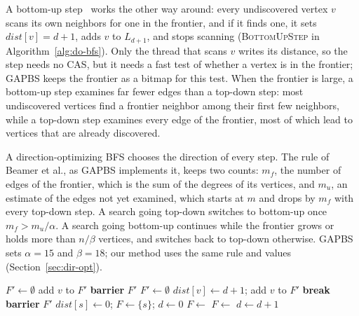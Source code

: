 A bottom-up step~\cite{beamer_dobfs} works the other way around: every undiscovered vertex $v$ scans its own neighbors for one in the frontier, and if it finds one, it sets $\mathit{dist}[v] = d+1$, adds $v$ to $L_{d+1}$, and stops scanning (\textsc{BottomUpStep} in Algorithm~\ref{alg:do-bfs}). Only the thread that scans $v$ writes its distance, so the step needs no CAS, but it needs a fast test of whether a vertex is in the frontier; GAPBS keeps the frontier as a bitmap for this test. When the frontier is large, a bottom-up step examines far fewer edges than a top-down step: most undiscovered vertices find a frontier neighbor among their first few neighbors, while a top-down step examines every edge of the frontier, most of which lead to vertices that are already discovered.

A direction-optimizing BFS chooses the direction of every step. The rule of Beamer et al., as GAPBS implements it, keeps two counts: $m_f$, the number of edges of the frontier, which is the sum of the degrees of its vertices, and $m_u$, an estimate of the edges not yet examined, which starts at $m$ and drops by $m_f$ with every top-down step. A search going top-down switches to bottom-up once $m_f > m_u / \alpha$. A search going bottom-up continues while the frontier grows or holds more than $n / \beta$ vertices, and switches back to top-down otherwise. GAPBS sets $\alpha = 15$ and $\beta = 18$; our method uses the same rule and values (Section~\ref{sec:dir-opt}).

\begin{algorithm}
\caption{Level-synchronous direction-optimizing BFS, as in GAPBS. Every step ends at a barrier.}
\label{alg:do-bfs}
\begin{algorithmic}[1]
    \State $F' \gets \emptyset$
                \State add $v$ to $F'$
            \EndIf
        \EndFor
    \EndFor
    \State \textbf{barrier} 
    \State \Return $F'$
\EndProcedure
\Statex
{}
    \State $F' \gets \emptyset$
                \State $\mathit{dist}[v] \gets d+1$; add $v$ to $F'$
                \State \textbf{break}
            \EndIf
        \EndFor
    \EndFor
    \State \textbf{barrier} 
    \State \Return $F'$
\EndProcedure
\Statex
{}
    \State $\mathit{dist}[s] \gets 0$; $F \gets \{s\}$; $d \gets 0$
            \State $F \gets$ 
        \Else
            \State $F \gets$ 
        \EndIf
        \State $d \gets d+1$
    \EndWhile
\EndProcedure
\end{algorithmic}
\end{algorithm}

